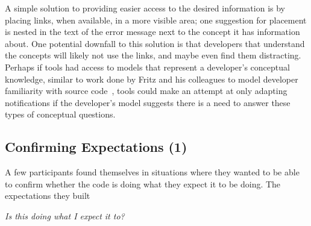 \documentclass[conference]{IEEEtran}
\begin{document}
A simple solution to providing easier access to the desired information is by placing links, when available, in a  more visible area; one suggestion for placement is nested in the text of the error message next to the concept it has information about. 
One potential downfall to this solution is that developers that understand the concepts will likely not use the links, and maybe even find them distracting.   
Perhaps if tools had access to models that represent a developer's conceptual knowledge, similar to work done by Fritz and his colleagues to model developer familiarity with source code~\cite{fritz2010degree}, tools could make an attempt at only adapting notifications if the developer's model suggests there is a need to answer these types of conceptual questions.


\noindent\subsection{\textbf{Confirming Expectations (1)}}\label{ce}

A few participants found themselves in situations where they wanted to be able to confirm whether the code is doing what they expect it to be doing. 
The expectations they built 


% 

\noindent\emph{Is this doing what I expect it to?} \\
\end{document}

